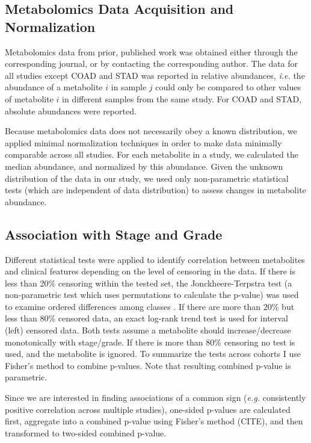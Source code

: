 \documentclass[10pt]{article}
\begin{document}
\subsection{Metabolomics Data Acquisition and Normalization}
Metabolomics data from prior, published work was obtained either through the corresponding journal, or by contacting the corresponding author. The data for all studies except COAD and STAD was reported in relative abundances, \textit{i.e.} the abundance of a metabolite $i$ in sample $j$ could only be compared to other values of metabolite $i$ in different samples from the same study. For COAD and STAD, absolute abundances were reported.

Because metabolomics data does not necessarily obey a known distribution, we applied minimal normalization techniques in order to make data minimally comparable across all studies. For each metabolite in a study, we calculated the median abundance, and normalized by this abundance. Given the unknown distribution of the data in our study, we used only non-parametric statistical tests (which are independent of data distribution) to assess changes in metabolite abundance.

\subsection{Association with Stage and Grade}
Different statistical tests were applied to identify correlation between metabolites and clinical features depending on the level of censoring in the data. If there is less than 20\% censoring within the tested set, the Jonckheere-Terpstra test (a non-parametric test which uses permutations to calculate the p-value) was used to examine ordered differences among classes . If there are more than 20\% but less than 80\% censored data, an exact log-rank trend test is used for interval (left) censored data. Both tests assume a metabolite should increase/decrease monotonically with stage/grade.  If there is more than 80\% censoring no test is used, and the metabolite is ignored. To summarize the tests across cohorts I use Fisher’s method to combine p-values. Note that resulting combined p-value is parametric. 

Since we are interested in finding associations of a common sign (\textit{e.g.} consistently positive correlation across multiple studies), one-sided p-values are calculated first, aggregate into a combined p-value using Fisher's method (CITE), and then transformed to two-sided combined p-value.
\end{document}

